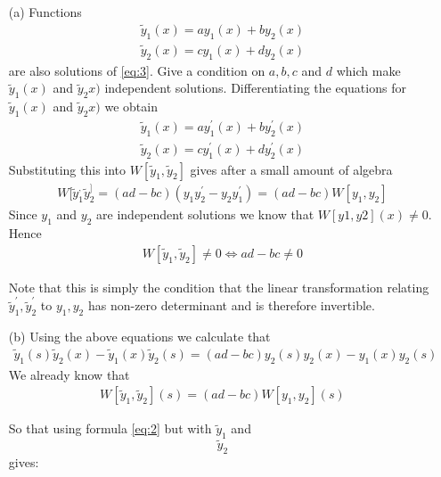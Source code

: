 \documentclass[12pt,a4paper]{article}
\begin{document}
\begin{enumerate}
	\item[(a)] Functions
		\begin{align*}
			\tilde{y}_1(x) = ay_1(x) + by_2(x)\\
			\tilde{y}_2(x) = cy_1(x) + dy_2(x)
		\end{align*}
	 are also solutions of \eqref{eq:3}.  Give a condition on $a, b, c$ and $d$ which make $\tilde{y}_1(x)$ and $\tilde{y}_2x)$ independent solutions.
Differentiating the equations for  $\tilde{y}_1(x)$ and $\tilde{y}_2x)$ we obtain
		\begin{align*}
			\tilde{y}_1(x) = ay_1^\prime(x) + by_2^\prime(x)\\
			\tilde{y}_2(x) = cy_1^\prime(x) + dy_2^\prime(x)
		\end{align*}
	Substituting this into $ W[\tilde{y}_1,\tilde{y}_2]$ gives after a small amount of algebra
	\begin{align*}
		W[\tilde{y}_1^,\tilde{y}_2^] = (ad - bc) (y_1y_2^\prime - y_2y_1^\prime) = (ad - bc)W[y_1,y_2]
	\end{align*}
	Since $y_1$ and $y_2$ are independent solutions we know that $W [y1 , y2 ](x) \neq 0.$ Hence 
	\begin{align*}
		W[\tilde{y}_1,\tilde{y}_2]  \neq 0 \iff  ad - bc \neq  0
	\end{align*}
	
	Note that this is simply the condition that the linear transformation relating $	\tilde{y}_1^\prime, 	\tilde{y}_2^\prime$ to $y_1, y_2$
has non-zero determinant and is therefore invertible.
\item[(b)] Using the above equations we calculate that
\begin{align*}
		\tilde{y}_1(s)\tilde{y}_2(x) - \tilde{y}_1(x)\tilde{y}_2(s)  = (ad -bc){y_2(s) y_2(x) - y_1(x)y_2(s)}
	\end{align*}
	We already know that
	\begin{align*}
				W[\tilde{y}_1,\tilde{y}_2](s) = (ad - bc)W [y_1, y_2](s)
		\end{align*}
	
	So that using formula \eqref{eq:2} but with $\tilde{y}_1$ and $$\tilde{y}_2$$ gives:
	

\end{enumerate}
\end{document}
